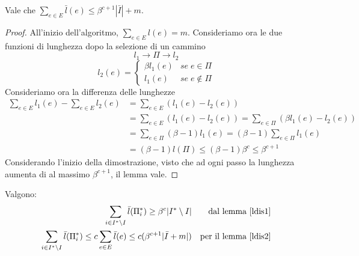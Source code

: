 \begin{lemma}
    \label{ldis2}
    Vale che $\sum_{e \in E}\bar{l}(e) \leq \beta^{c+1}|\bar{I}| + m$.
\end{lemma}
\begin{proof}
    All'inizio dell'algoritmo, $\sum_{e \in E} l(e) = m$.
    Consideriamo ora le due funzioni di lunghezza dopo la selezione di un cammino
    $$l_1 \longrightarrow \Pi \longrightarrow l_2$$
    \[ 
        l_2(e) = 
        \begin{cases}
        \beta l_1(e) & \mathit{se}\;e \in \Pi\\
        l_1(e) & \mathit{se}\;e \notin \Pi
     \end{cases}
    \]
    Consideriamo ora la differenza delle lunghezze
    \begin{equation}
        \begin{aligned}
            \sum_{e \in E} l_1(e) - \sum_{e \in E} l_2(e)&= \sum_{e \in E} (l_1(e) - l_2(e))\\
            &= \sum_{e \in E} (l_1(e) - l_2(e)) = \sum_{e \in \Pi} (\beta l_1(e) - l_2(e))\\
            &= \sum_{e \in \Pi} (\beta -1)l_1(e) = (\beta -1) \sum_{e \in \Pi} l_1(e)\\
            &= (\beta -1)l(\Pi) \leq (\beta -1)\beta^c \leq \beta^{c+1}
        \end{aligned}
    \end{equation}
    Considerando l'inizio della dimostrazione, visto che ad ogni passo la lunghezza aumenta di al 
    massimo $\beta^{c+1}$, il lemma vale.
\end{proof}
\begin{remark}
    \label{oss3dis}
    Valgono:
    \begin{equation}
        \begin{aligned}
            \sum_{i \in I^* \setminus I} \bar{l}(\Pi_i^*) \geq \beta^c|I^* \setminus I| && \text{dal lemma \ref{ldis1}}\\
            \sum_{i \in I^* \setminus I} \bar{l}(\Pi_i^*) \leq c\sum_{e \in E} \bar{l}(e) \leq c(\beta ^{c+1}|\bar{I} + m|)
            && \text{per il lemma \ref{ldis2}}
        \end{aligned}
    \end{equation}
\end{remark}


